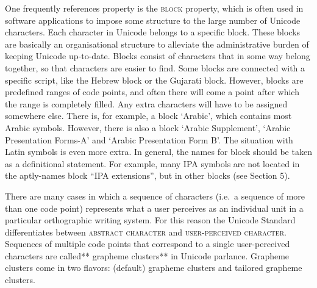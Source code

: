 One frequently references property is the \textsc{block} property, which is often used in software applications to impose some structure to the large number of Unicode characters. Each character in Unicode belongs to a specific block. These blocks are basically an organisational structure to alleviate the administrative burden of keeping Unicode up-to-date. Blocks consist of characters that in some way belong together, so that characters are easier to find. Some blocks are connected with a specific script, like the Hebrew block or the Gujarati block. However, blocks are predefined ranges of code points, and often there will come a point after which the range is completely filled. Any extra characters will have to be assigned somewhere else. There is, for example, a block `Arabic', which contains most Arabic symbols. However, there is also a block `Arabic Supplement', `Arabic Presentation Forms-A' and `Arabic Presentation Form B'. The situation with Latin symbols is even more extra. In general, the names for block should be taken as a definitional statement. For example, many IPA symbols are not located in the aptly-names block ``IPA extensions'', but in other blocks (see Section 5).

There are many cases in which a sequence of characters (i.e.~a sequence of more than one code point) represents what a user perceives as an individual unit in a particular orthographic writing system. For this reason the Unicode Standard differentiates between \textsc{abstract character} and \textsc{user-perceived character}. Sequences of multiple code points that correspond to a single user-perceived characters are called** grapheme clusters** in Unicode parlance. Grapheme clusters come in two flavors: (default) grapheme clusters and tailored grapheme clusters.

